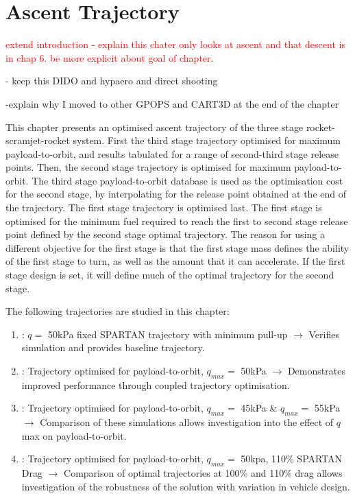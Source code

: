 
\cleardoublepage
\chapter{Ascent Trajectory}\label{chapter:numerical}

\textcolor{red}{ extend introduction - explain this chater only looks at ascent and that descent is in chap 6. be more explicit about goal of chapter.}

- keep this DIDO and hypaero and direct shooting

-explain why I moved to other GPOPS and CART3D at the end of the chapter


This chapter presents an optimised ascent trajectory of the three stage rocket-scramjet-rocket system. First the third stage trajectory optimised for maximum payload-to-orbit, and results tabulated for a range of second-third stage release points. Then, the second stage trajectory is optimised for maximum payload-to-orbit. The third stage payload-to-orbit database is used as the optimisation cost for the second stage, by interpolating for the release point obtained at the end of the trajectory. The first stage trajectory is optimised last. The first stage is optimised for the minimum fuel required to reach the first to second stage release point defined by the second stage optimal trajectory. The reason for using a different objective for the first stage is that the first stage mass defines the ability of the first stage to turn, as well as the amount that it can accelerate. If the first stage design is set, it will define much of the optimal trajectory for the second stage. 

The following trajectories are studied in this chapter: 
\begin{enumerate}
	\item: $q = $ 50kPa fixed SPARTAN trajectory with minimum pull-up \newline$\rightarrow$ Verifies simulation and provides baseline trajectory.
	\item: Trajectory optimised for payload-to-orbit, $q_{max} = $ 50kPa \newline$\rightarrow$ Demonstrates improved performance through coupled trajectory optimisation.
	\item: Trajectory optimised for payload-to-orbit, $q_{max} = $ 45kPa \& $q_{max} = $ 55kPa \newline$\rightarrow$ Comparison of these simulations allows investigation into the effect of $q$ max on payload-to-orbit.
	\item: Trajectory optimised for payload-to-orbit,  $q_{max} = $ 50kpa, 110\% SPARTAN Drag \newline$\rightarrow$ Comparison of optimal trajectories at 100\% and 110\% drag allows investigation of the robustness of the solution with variation in vehicle design. 
\end{enumerate}





